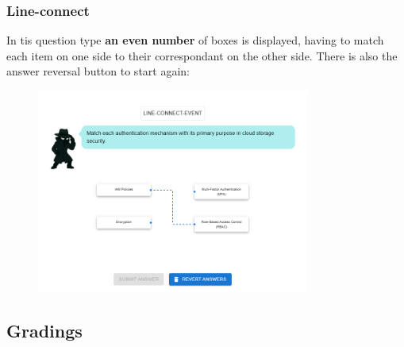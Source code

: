 \subsubsection{Line-connect}
In tis question type \textbf{an even number} of boxes is displayed, having to match each item on one side to their correspondant
on the other side. There is also the answer reversal button to start again:
\begin{figure}[htbp]
    \centering
    \includegraphics[width=0.8\textwidth]{images/Line_Connect.png}
\end{figure}

\subsection{Gradings}

